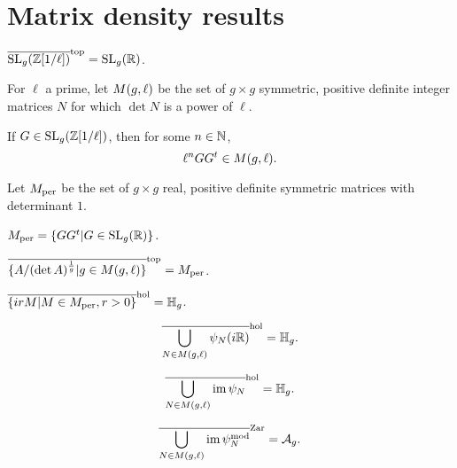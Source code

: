 \documentclass{amsart}
\begin{document}
\section{Matrix density results}
\label{sec:matr-dens-results}

\begin{lemma}
  $\overline{\operatorname{SL}_g(\mathbb{Z}[1/\ell])}^\mathrm{top} = \operatorname{SL}_g(\mathbb{R})$.
\end{lemma}

\begin{definition}
  For $\ell$ a prime, let $M(g,\ell)$ be the set of $g \times g$ symmetric, positive definite integer matrices $N$ for which $\det N$ is a power of $\ell$.
\end{definition}

\begin{lemma}
  If $G \in \operatorname{SL}_g(\mathbb{Z}[1/\ell])$, then for some $n \in \mathbb{N}$,
  \[
    \ell^n GG^t \in M(g,\ell).
  \]
\end{lemma}

\begin{definition}
  Let $M_{\textrm{per}}$ be the set of $g \times g$ real, positive definite symmetric matrices  with determinant $1$.
\end{definition}

\begin{lemma}
  $M_{\textrm{per}} = \{GG^t | G \in \operatorname{SL}_g(\mathbb{R})\}$.
\end{lemma}

\begin{proposition}
  $\overline{\{A/(\det A)^{\frac{1}{g}} | g \in M(g,\ell)\}}^\mathrm{top} = M_{\textrm{per}}$.
\end{proposition}

\begin{lemma}
  $\overline{\{ irM | M \in M_{\textrm{per}}, r > 0\}}^\mathrm{hol} = \mathbb{H}_g$.
\end{lemma}

\begin{lemma}
  \[
    \overline{\bigcup_{N \in M(g,\ell)} \psi_N(i\mathbb{R})}^\mathrm{hol} = \mathbb{H}_g.
  \]
\end{lemma}

\begin{lemma}
  \[
    \overline{\bigcup_{N \in M(g,\ell)} \operatorname{im} \psi_N}^\mathrm{hol} = \mathbb{H}_g.
  \]
\end{lemma}

\begin{proposition}
  \[
    \overline{\bigcup_{N \in M(g,\ell)} \operatorname{im} \psi_N^{\textrm{mod}}}^\mathrm{Zar} = \mathcal{A}_g.
  \]
\end{proposition}
\end{document}
